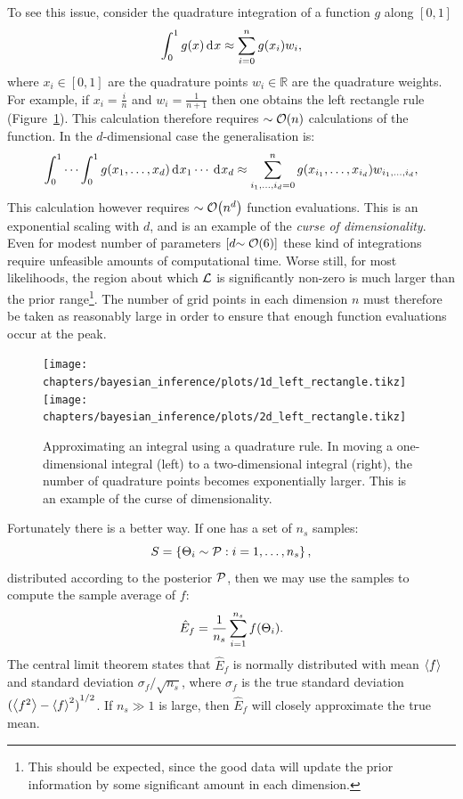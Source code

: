 To see this issue, consider the quadrature integration of a function $g$ along $[0,1]$
\begin{equation}
  \int_0^1 g(x) \operatorname{d}^{}\!{x} \approx \sum\limits_{i=0}^{n} g(x_i) w_i,
  \label{eqn:bay:quadrature_1d}
\end{equation}
where ${x_i\in[0,1]}$ are the quadrature points ${w_i\in\mathbb{R}}$ are the quadrature weights. For example, if $x_i = \frac{i}{n}$ and $w_i=\frac{1}{n+1}$ then one obtains the left rectangle rule (Figure~\ref{fig:bay:quadrature}). This calculation therefore requires ${\sim\mathcal{O}{\left(n\right)}}$ calculations of the function. In the $d$-dimensional case the generalisation is:
\begin{equation}
  \int_0^1\cdots\int_0^1 g(x_1,\ldots,x_d) \operatorname{d}^{}\!{x_1}\cdots \: \operatorname{d}^{}\!{x_d} \approx \sum\limits_{i_1,\ldots,i_d=0}^{n} g(x_{i_1},\ldots,x_{i_d}) w_{i_1,\ldots,i_d},
  \label{eqn:bay:quadrature_nd}
\end{equation}
This calculation however requires ${\sim\mathcal{O}{\left(n^d\right)}}$ function evaluations. This is an exponential scaling with $d$, and is an example of the {\em curse of dimensionality}. Even for modest number of parameters $\left[ d{\sim\mathcal{O}{\left(6\right)}} \right]$ these kind of integrations require unfeasible amounts of computational time. Worse still, for most likelihoods, the region about which $\mathcal{L}$ is significantly non-zero is much larger than the prior range\footnote{This should be expected, since the good data will update the prior information by some significant amount in each dimension.}. The number of grid points in each dimension $n$ must therefore be taken as reasonably large in order to ensure that enough function evaluations occur at the peak.

\begin{figure}[tp]
  \centering
    \texttt{[image: chapters/bayesian\_inference/plots/1d\_left\_rectangle.tikz]}
    \texttt{[image: chapters/bayesian\_inference/plots/2d\_left\_rectangle.tikz]}
  \caption{Approximating an integral using a quadrature rule. In moving a one-dimensional integral (left) to a two-dimensional integral (right), the number of quadrature points becomes exponentially larger. This is an example of the curse of dimensionality.\label{fig:bay:quadrature}}
\end{figure}

Fortunately there is a better way. If one has a set of $n_s$ samples:
\begin{equation}
  S = \left\{ \Theta_i\sim\mathcal{P}:i=1,\ldots,n_s \right\},
  \label{eqn:bay:samples}
\end{equation}
distributed according to the posterior $\mathcal{P}$, then we may use the samples to compute the sample average of $f$:
\begin{equation}
  \hat{E}_f = \frac{1}{n_s}\sum\limits_{i=1}^{n_s} f(\Theta_i).
  \label{eqn:bay:ehat}
\end{equation}
The central limit theorem states that $\hat{E}_f$ is normally distributed with mean ${\left\langle{f}\right\rangle}$ and standard deviation $\sigma_f/\sqrt{n_s}$, where $\sigma_f$ is the true standard deviation ${({\left\langle{f^2}\right\rangle}-{\left\langle{f}\right\rangle}^2)}^{1/2}$. If $n_s\gg 1$ is large, then $\hat{E}_f$ will closely approximate the true mean. 

